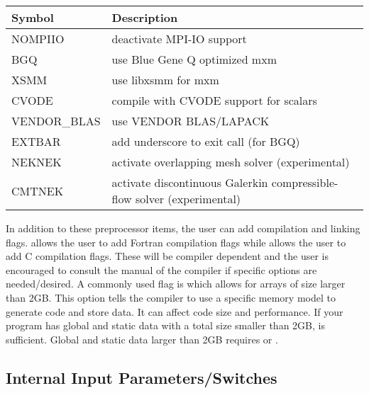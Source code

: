\documentclass[letterpaper,10pt,english]{sphinxmanual}
\begin{document}
\begin{savenotes}\sphinxattablestart
\centering
{}
\label{\detokenize{appendix:tab-pplist}}\label{\detokenize{appendix:id2}}
\sphinxaftercaption
\begin{tabulary}{\linewidth}[t]{|T|T|}
\hline
\sphinxstyletheadfamily 
Symbol
&\sphinxstyletheadfamily 
Description
\\
\hline
NOMPIIO
&
deactivate MPI-IO support
\\
\hline
BGQ
&
use Blue Gene Q optimized mxm
\\
\hline
XSMM
&
use libxsmm for mxm
\\
\hline
CVODE
&
compile with CVODE support for scalars
\\
\hline
VENDOR\_BLAS
&
use VENDOR BLAS/LAPACK
\\
\hline
EXTBAR
&
add underscore to exit call (for BGQ)
\\
\hline
NEKNEK
&
activate overlapping mesh solver (experimental)
\\
\hline
CMTNEK
&
activate discontinuous Galerkin compressible-flow solver (experimental)
\\
\hline
\end{tabulary}
\par
\sphinxattableend\end{savenotes}

In addition to these preprocessor items, the user can add compilation and linking flags.
 allows the user to add Fortran compilation flags while  allows the user to
add C compilation flags.
These will be compiler dependent and the user is encouraged to consult the manual of the compiler if specific options are needed/desired.
A commonly used flag is  which allows for arrays of size larger than 2GB.
This option  tells the compiler to use a specific memory model to generate code and store data.
It can affect code size and performance.
If your program has global and static data with a total size smaller than 2GB,  is sufficient.
Global and static data larger than 2GB requires  or .


\subsection{Internal Input Parameters/Switches}
\label{\detokenize{appendix:internal-input-parameters-switches}}
\end{document}
